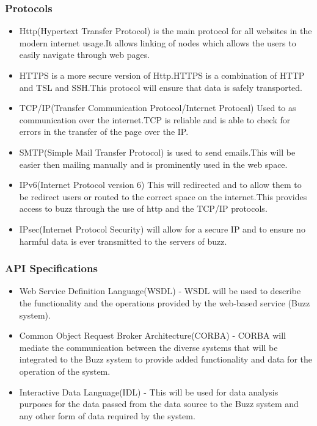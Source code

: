 \subsubsection{Protocols}
\begin{itemize}
\item Http(Hypertext Transfer Protocol) is the main protocol for all websites in the modern internet usage.It allows linking of nodes which allows the users to easily navigate through web pages.
\item HTTPS is a more secure version of Http.HTTPS is a combination of HTTP and TSL and SSH.This protocol will ensure that data is safely transported.
\item TCP/IP(Transfer Communication Protocol/Internet Protocal) Used to as communication over the internet.TCP is reliable and is able to check for errors in the transfer of the page over the IP.
\item SMTP(Simple Mail Transfer Protocol) is used to send emails.This will be easier then mailing manually and is prominently used in the web space.
\item IPv6(Internet Protocol version 6) This will  redirected and to allow them to be redirect users or routed to the correct space on the internet.This provides access to buzz through the use of http and the TCP/IP protocols.
\item IPsec(Internet Protocol Security) will allow for a secure IP and to ensure no harmful data is ever transmitted to the servers of buzz.
\end{itemize}

\subsubsection{API Specifications}
\begin{itemize}
\item Web Service Definition Language(WSDL) - WSDL will be used to describe the functionality and the operations provided by the web-based service (Buzz system).
\item Common Object Request Broker Architecture(CORBA) - CORBA will mediate the communication between the diverse systems that will be integrated to the Buzz system to provide added functionality and data for the operation of the system.
\item Interactive Data Language(IDL) - This will be used for data analysis purposes for the data passed from the data source to the Buzz system and any other form of data required by the system.
\end{itemize}